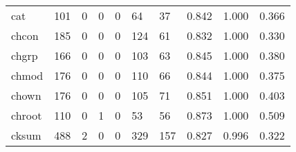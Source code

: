 \begin{longtable}{lp{1.3cm}p{1.3cm}p{1.3cm}p{1.3cm}p{1.3cm}p{1.3cm}p{1.3cm}p{1.3cm}p{1.3cm}}
cat       &                    101 &                                             0 &                                            0 &                                           0 &                                           64 &                                         37 &                                0.842 &                                  1.000 &                                0.366 \\
chcon     &                    185 &                                             0 &                                            0 &                                           0 &                                          124 &                                         61 &                                0.832 &                                  1.000 &                                0.330 \\
chgrp     &                    166 &                                             0 &                                            0 &                                           0 &                                          103 &                                         63 &                                0.845 &                                  1.000 &                                0.380 \\
chmod     &                    176 &                                             0 &                                            0 &                                           0 &                                          110 &                                         66 &                                0.844 &                                  1.000 &                                0.375 \\
chown     &                    176 &                                             0 &                                            0 &                                           0 &                                          105 &                                         71 &                                0.851 &                                  1.000 &                                0.403 \\
chroot    &                    110 &                                             0 &                                            1 &                                           0 &                                           53 &                                         56 &                                0.873 &                                  1.000 &                                0.509 \\
cksum     &                    488 &                                             2 &                                            0 &                                           0 &                                          329 &                                        157 &                                0.827 &                                  0.996 &                                0.322 \\

\end{longtable}
